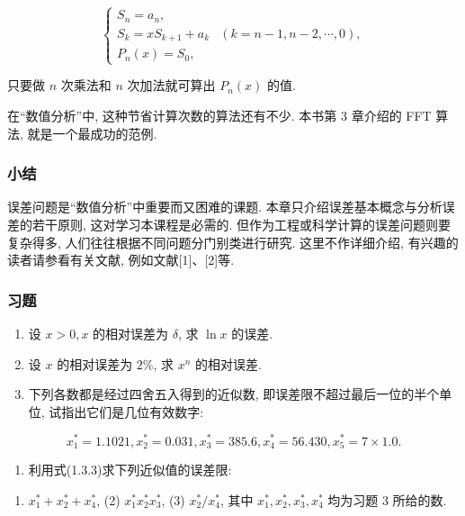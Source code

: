\documentclass[
  10pt,
  fontset=fandol]{ctexart}
\providecommand{\tightlist}{%
  \setlength{\itemsep}{0pt}\setlength{\parskip}{0pt}}
\begin{document}
\[
\begin{cases} S_n = a_n, \\ S_k = xS_{k+1} + a_k & (k=n-1,n-2,\cdots,0), \\ P_n(x) = S_0, \end{cases} \tag{1.4.1}
\]

只要做 \(n\) 次乘法和 \(n\) 次加法就可算出 \(P_n(x)\) 的值.

在``数值分析''中, 这种节省计算次数的算法还有不少. 本书第 3 章介绍的 FFT 算法, 就是一个最成功的范例.

\subsubsection{小结}\label{ux5c0fux7ed3}

误差问题是``数值分析''中重要而又困难的课题. 本章只介绍误差基本概念与分析误差的若干原则, 这对学习本课程是必需的. 但作为工程或科学计算的误差问题则要复杂得多, 人们往往根据不同问题分门别类进行研究. 这里不作详细介绍, 有兴趣的读者请参看有关文献, 例如文献{[}1{]}、{[}2{]}等.

\subsubsection{习题}\label{ux4e60ux9898}

\begin{enumerate}
\def\labelenumi{\arabic{enumi}.}
\item
  设 \(x>0, x\) 的相对误差为 \(\delta\), 求 \(\ln x\) 的误差.
\item
  设 \(x\) 的相对误差为 \(2\%\), 求 \(x^n\) 的相对误差.
\item
  下列各数都是经过四舍五入得到的近似数, 即误差限不超过最后一位的半个单位, 试指出它们是几位有效数字:
\end{enumerate}

\[
x_1^* = 1.1021, x_2^* = 0.031, x_3^* = 385.6, x_4^* = 56.430, x_5^* = 7 \times 1.0.
\]

\begin{enumerate}
\def\labelenumi{\arabic{enumi}.}
\setcounter{enumi}{3}
\tightlist
\item
  利用式(1.3.3)求下列近似值的误差限:
\end{enumerate}

\begin{enumerate}
\def\labelenumi{(\arabic{enumi})}
\tightlist
\item
  \(x_1^* + x_2^* + x_4^*\), (2) \(x_1^* x_2^* x_3^*\), (3) \(x_2^* / x_4^*\), 其中 \(x_1^*, x_2^*, x_3^*, x_4^*\) 均为习题 3 所给的数.
\end{enumerate}
\end{document}
